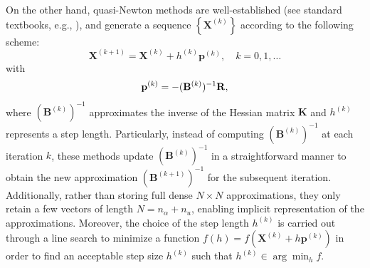 On the other hand, quasi-Newton methods are well-established (see standard textbooks, e.g., \cite{Nocedal1999-zr,Nocedal2006-qh}), and generate a sequence $\left\{\mathbf{X}^{(k)}\right\}$ according to the following scheme:
\begin{equation}
\mathbf{X}^{(k+1)} = \mathbf{X}^{(k)} + h^{(k)} \mathbf{p} ^{(k)}, \quad k=0,1,\ldots
\end{equation}
with
\begin{equation}
\mathbf{p}^{(k)}=-(\mathbf{B}^{(k)})^{-1}{\bf R},
\end{equation}
where $(\mathbf{B}^{(k)})^{-1}$ approximates the inverse of the Hessian matrix  $\mathbf{K}$ and $h^{(k)}$ represents a step length. Particularly, instead of computing $(\mathbf{B}^{(k)})^{-1}$  at each iteration $k$, these methods update $(\mathbf{B}^{(k)})^{-1}$ in a straightforward manner to obtain the new approximation $(\mathbf{B}^{(k+1)})^{-1}$  for the subsequent iteration. Additionally, rather than storing full dense $N \times N$ approximations, they only retain a few vectors of length $N=n_\alpha + n_u$, enabling implicit representation of the approximations. Moreover, the choice of the step length $h^{(k)}$ is carried out through a line search to minimize a function $f(h) = f(\mathbf{X}^{(k)} + h \mathbf{p}^{(k)})$ in order to find an acceptable step size $h^{(k)}$ such that $h^{(k)} \in \arg \min_{h} f$.


